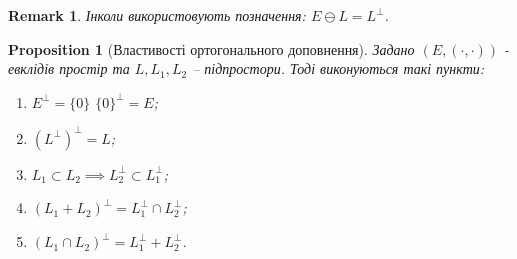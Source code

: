 \documentclass[a4paper, 10pt]{article}
\theoremstyle{theoremdd}
\newtheorem{proposition}[theorem]{Proposition}
\newtheorem{remark}[theorem]{Remark}
\begin{document}
\begin{remark}
Інколи використовують позначення: $E \ominus L = L^{\perp}$.
\end{remark}

\begin{proposition}[Властивості ортогонального доповнення]
Задано $(E,(\cdot,\cdot))$ - евклідів простір та $L,L_1,L_2$ -- підпростори. Тоді виконуються такі пункти:
\begin{enumerate}[nosep, wide=0pt, label={\arabic*)}]
\item $E^{\perp} = \{0\}$ \qquad $\{0\}^{\perp} = E$;
\item $(L^{\perp})^{\perp} = L$;
\item $L_1 \subset L_2 \implies L_2^{\perp} \subset L_1^{\perp}$;
\item $(L_1+L_2)^{\perp} = L_1^{\perp} \cap L_2^{\perp}$;
\item $(L_1 \cap L_2)^{\perp} = L_1^{\perp} + L_2^{\perp}$.
\end{enumerate}
\end{proposition}
\end{document}
